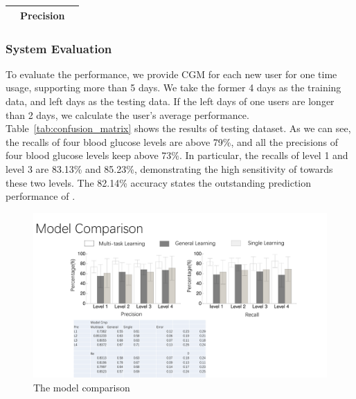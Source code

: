 \begin{table}[]
\begin{tabular}{|c|c|c|c|c|l|l|}
\multicolumn{1}{|l|}{}                                                           & \multicolumn{4}{c|}{\textbf{Precision}}                                                                                 & \multicolumn{2}{l|}{}                                                                             \\ \hline
\end{tabular}
\end{table}



\subsubsection{System Evaluation}

To evaluate the \sysname performance, we provide CGM for each new user for one time usage, supporting more than 5 days. We take the former 4 days as the training data, and left days as the testing data. If the left days of one users are longer than 2 days, we calculate the user's average performance. Table~\ref{tab:confusion_matrix} shows the results of testing dataset. As we can see,  the recalls of four blood glucose levels are above 79\%, and all the precisions of four blood glucose levels keep above 73\%. In particular, the recalls of level 1 and level 3 are 83.13\% and 85.23\%, demonstrating the high sensitivity of \sysname towards these two levels. The 82.14\% accuracy states the outstanding prediction performance of \sysname.



\begin{figure}[!t]
\centering
\includegraphics[width=0.9\columnwidth]{./img/CMP_Models.pdf}
\caption{The model comparison}
\label{fig:cmp_model}
\end{figure}



